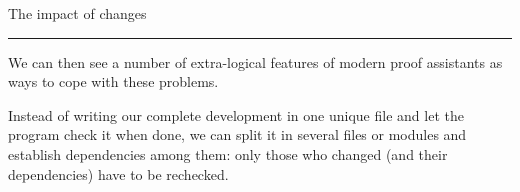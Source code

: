 \documentclass[ignorenonframetext,red]{beamer}
\begin{document}
\begin{frame}{The impact of changes}
\begin{center}
  \end{center}
  \pause
\end{frame}
\hrule

We can then see a number of extra-logical features of modern proof
assistants as ways to cope with these problems. 

Instead of writing our complete development in one unique file and let
the program check it when done, we can split it in several files or
modules and establish dependencies among them: only those who changed
(and their dependencies) have to be rechecked.
\end{document}
